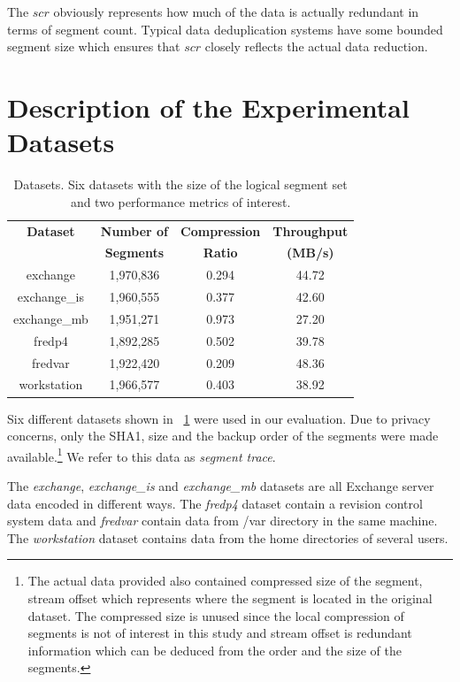 The $\mathit{scr}$ obviously represents how much of the data is actually redundant in terms of segment count. Typical data deduplication systems have some bounded segment size which ensures that $\mathit{scr}$ closely reflects the actual data reduction. 

\section{Description of the Experimental Datasets}\label{dss}

\begin{table}[!t]
\renewcommand{\arraystretch}{1.3}
\caption{Datasets. Six datasets with the size of the logical segment set and two performance metrics of interest.}
\label{ds_t}
\centering
\begin{tabular}{c||c c c}
\hline
\bfseries Dataset 	&\bfseries Number of	&\bfseries Compression 	&\bfseries Throughput	\\
 			&\bfseries Segments	&\bfseries Ratio 		&\bfseries (MB/s)		\\
\hline\hline
exchange 		&1,970,836			&0.294			&44.72			\\
exchange\_is	&1,960,555			&0.377			&42.60			\\
exchange\_mb 	&1,951,271			&0.973			&27.20			\\
fredp4		&1,892,285			&0.502			&39.78			\\
fredvar		&1,922,420			&0.209			&48.36			\\
workstation		&1,966,577			&0.403			&38.92			\\
\hline
\end{tabular}
\end{table}

Six different datasets shown in \tablename~\ref{ds_t} were used in our evaluation. Due to privacy concerns, only the SHA1, size and the backup order of the segments were made available.\footnote{The actual data provided also contained compressed size of the segment, stream offset which represents where the segment is located in the original dataset. The compressed size is unused since the local compression of segments is not of interest in this study and stream offset is redundant information which can be deduced from the order and the size of the segments.} We refer to this data as \emph{segment trace}. 

The \emph{exchange}, \emph{exchange\_is} and \emph{exchange\_mb} datasets are all Exchange server data encoded in different ways. The \emph{fredp4} dataset contain a revision control system data and \emph{fredvar} contain data from /var directory in the same machine. The \emph{workstation} dataset contains data from the home directories of several users.  

